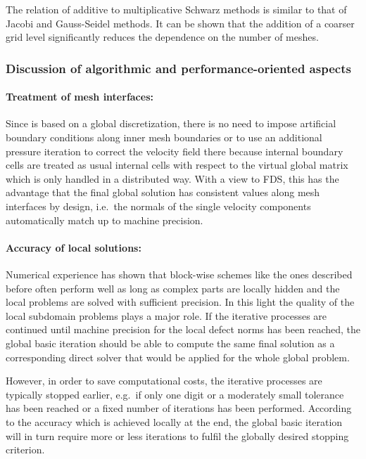 The relation of additive to multiplicative Schwarz methods is similar to that of Jacobi and Gauss-Seidel methods.
It can be shown that the addition of a coarser grid level significantly reduces the dependence on the number of meshes.

\subsubsection{Discussion of algorithmic and performance-oriented aspects}
\label{SEC_SCARC_discussion}

\paragraph{Treatment of mesh interfaces:}
Since \scarc{} is based on a global discretization, there is no need to impose artificial boundary conditions along inner mesh boundaries or 
to use an additional pressure iteration to correct the velocity field there because internal boundary cells are treated as usual internal cells with respect to the virtual global matrix which is only handled in a distributed way. With a view to FDS, this has the advantage that the final global solution has consistent values along mesh interfaces by design, i.e.\ the normals of the single velocity components automatically match up to machine precision.

\paragraph{Accuracy of local solutions:}
Numerical experience has shown that block-wise schemes like the ones described before often perform well as long as complex parts 
are locally hidden and the local problems are solved with sufficient precision. In this light the quality of the local subdomain problems plays a major role. 
If the iterative processes are continued until machine precision for the local defect norms has been reached, the global basic iteration should be able to compute the same final solution as a corresponding direct solver that would be applied for the whole global problem.

However, in order to save computational costs, the iterative processes are typically stopped earlier, e.g.\ if only one digit or a moderately small tolerance has been reached or a fixed number of iterations has been performed.
According to the accuracy which is achieved locally at the end, the global basic iteration will in turn require more or less iterations to fulfil the globally desired stopping criterion. 


